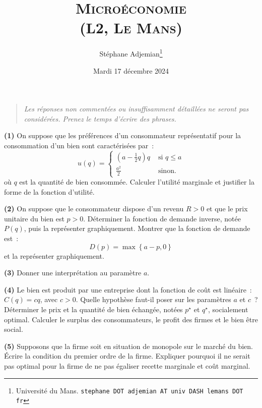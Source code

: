 \documentclass[10pt,a4paper,notitlepage,twocolumn]{article}
\newcommand{\question}[1]{\textbf{(#1)}}
\begin{document}
\title{\textsc{Microéconomie\\ \small{(L2, Le Mans)}}}
\author{Stéphane Adjemian\thanks{Université du Mans. \texttt{stephane
DOT adjemian AT univ DASH lemans DOT fr}}}
\date{Mardi 17 décembre 2024}

\maketitle

\thispagestyle{empty}

\bigskip

\begin{quote}
  \textit{Les réponses non commentées ou insuffisamment détaillées ne
  seront pas considérées. Prenez le temps d'écrire des phrases.}
\end{quote}

\bigskip
\bigskip

\question{1} On suppose que les préférences d'un consommateur
représentatif pour la consommation d'un bien sont caractérisées par~:
\[
  u(q) =
  \begin{cases}
    \left( a - \frac{1}{2}q \right)q &\text{ si } q\leq a\\
    \frac{a^2}{2} &\text{ sinon.}
  \end{cases}
\]
où $q$ est la quantité de bien consommée. Calculer l'utilité
marginale et justifier la forme de la fonction d'utilité.\newline

\question{2} On suppose que le consommateur dispose d'un revenu $R>0$
et que le prix unitaire du bien est $p>0$. Déterminer la fonction de
demande inverse, notée $P(q)$, puis la représenter
graphiquement. Montrer que la fonction de demande est~:
\[
  D(p) = \max\left\{ a-p, 0 \right\}
\]
et la représenter graphiquement.\newline

\question{3} Donner une interprétation au paramètre $a$.\newline

\question{4} Le bien est produit par une entreprise dont la fonction
de coût est linéaire~: $C(q) = c q$, avec $c>0$. Quelle hypothèse
faut-il poser sur les paramètres $a$ et $c$~? Déterminer le prix et la
quantité de bien échangée, notées $p^\star$ et $q^\star$, socialement
optimal. Calculer le surplus des consommateurs, le profit des firmes
et le bien être social.\newline

\question{5} Supposons que la firme soit en situation de monopole sur
le marché du bien. Écrire la condition du premier ordre de la
firme. Expliquer pourquoi il ne serait pas optimal pour la firme de ne
pas égaliser recette marginale et coût marginal.\newline
\end{document}
